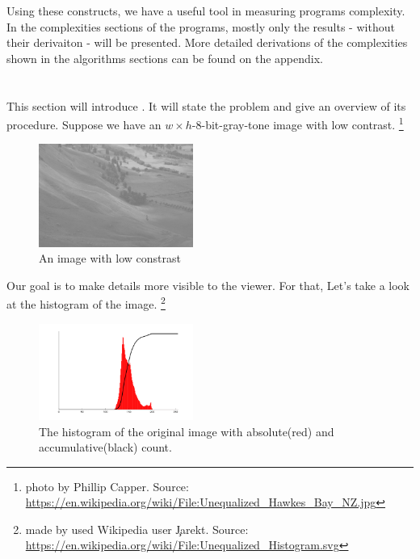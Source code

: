   Using these constructs, we have a useful tool in measuring
  programs complexity. In the complexities sections of
  the programs, mostly only the results - without their derivaiton -
  will be presented. More detailed derivations of the complexities shown
  in the algorithms sections can be found
  on the appendix.
   
\section{\algo}
  This section will introduce \algo. It will state the problem and give
  an overview of its procedure.
  Suppose we have an $w \times h$-8-bit-gray-tone image with low contrast.
  \footnote{photo by Phillip Capper. Source: \url{https://en.wikipedia.org/wiki/File:Unequalized_Hawkes_Bay_NZ.jpg}}
      
      \begin{figure}[h]
        \centering
        \includegraphics[width=0.45\textwidth]{img-org}
        \caption{An image with low constrast}
        \label{fig:img-org}
      \end{figure}
      Our goal is to make details more visible to the viewer. For that,
      Let's take a look at the histogram of the image.
      \footnote{made by used Wikipedia user \c{Jarekt}. Source: \url{https://en.wikipedia.org/wiki/File:Unequalized_Histogram.svg}}
      
      \begin{figure}[h]
        \centering
        \includegraphics[width=0.45\textwidth]{hist-org}
        \caption{The histogram of the original image with absolute(red) and accumulative(black) count.}
        \label{fig:hist-org}
      \end{figure}
      
